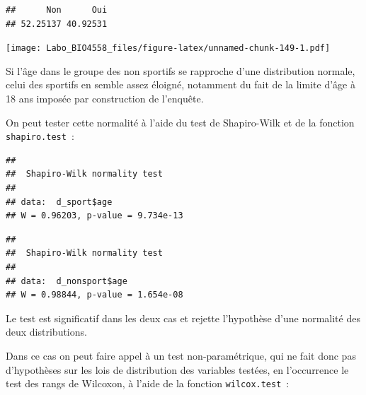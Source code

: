 \documentclass[12pt,]{book}
\newenvironment{Shaded}{\begin{snugshade}}{\end{snugshade}}
\newcommand{\KeywordTok}[1]{\textcolor[rgb]{0.13,0.29,0.53}{\textbf{#1}}}
\newcommand{\NormalTok}[1]{#1}
\newcommand{\OperatorTok}[1]{\textcolor[rgb]{0.81,0.36,0.00}{\textbf{#1}}}
\begin{document}
\begin{verbatim}
##      Non      Oui 
## 52.25137 40.92531
\end{verbatim}

\begin{Shaded}
\end{Shaded}

\texttt{[image: Labo\_BIO4558\_files/figure-latex/unnamed-chunk-149-1.pdf]}

Si l'âge dans le groupe des non sportifs se rapproche d'une distribution normale, celui des sportifs en semble assez éloigné, notamment du fait de la limite d'âge à 18 ans imposée par construction de l'enquête.

On peut tester cette normalité à l'aide du test de Shapiro-Wilk et de la fonction \texttt{shapiro.test}~:

\begin{Shaded}
\end{Shaded}

\begin{verbatim}
## 
##  Shapiro-Wilk normality test
## 
## data:  d_sport$age
## W = 0.96203, p-value = 9.734e-13
\end{verbatim}

\begin{Shaded}
\end{Shaded}

\begin{verbatim}
## 
##  Shapiro-Wilk normality test
## 
## data:  d_nonsport$age
## W = 0.98844, p-value = 1.654e-08
\end{verbatim}

Le test est significatif dans les deux cas et rejette l'hypothèse d'une normalité des deux distributions.

Dans ce cas on peut faire appel à un test non-paramétrique, qui ne fait donc pas d'hypothèses sur les lois de distribution des variables testées, en l'occurrence le test des rangs de Wilcoxon, à l'aide de la fonction \texttt{wilcox.test}~:
\end{document}
